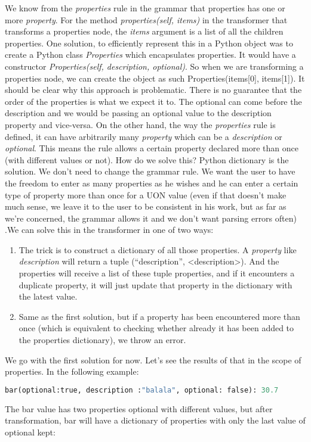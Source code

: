 \documentclass[12pt]{article}
\begin{document}
We know from the \emph{properties} rule in the grammar that properties has one or more \emph{property}. For the method \emph{properties(self, items)} in the transformer that transforms a properties node, the \emph{items} argument is a list of all the children properties. One solution, to efficiently represent this in a Python object was to create a Python class \emph{Properties} which encapsulates properties. It would have a constructor \emph{Properties(self, description, optional)}. So when we are transforming a properties node, we can create the object as such Properties(items[0], items[1]). It should be clear why this approach is problematic. There is no guarantee that the order of the properties is what we expect it to. The optional can come before the description and we would be passing an optional value to the description property and vice-versa. On the other hand, the way the \emph{properties} rule is defined, it can have arbitrarily many \emph{property} which can be a \emph{description} or \emph{optional}. This means the rule allows a certain property declared more than once (with different values or not).
How do we solve this? Python dictionary is the solution. We don’t need to change the grammar rule. We want the user to have the freedom to enter as many properties as he wishes and he can enter a certain type of property more than once for a UON value (even if that doesn't make much sense, we leave it to the user to be consistent in his work, but as far as we're concerned, the grammar allows it and we don't want parsing errors often) .We can solve this in the transformer in one of two ways: 
\begin{enumerate}
    \item The trick is to construct a dictionary of all those properties. A \emph{property} like \emph{description} will return a tuple (“description”, <description>). And the properties will receive a list of these tuple properties, and if it encounters a duplicate property, it will just update that property in the dictionary with the latest value.
    \item Same as the first solution, but if a property has been encountered more than once (which is equivalent to checking whether already it has been added to the properties dictionary), we throw an error.
\end{enumerate}

We go with the first solution for now. Let's see the results of that in the scope of properties. In the following example:
\begin{lstlisting}[language=Python]
bar(optional:true, description :"balala", optional: false): 30.7
\end{lstlisting}
The bar value has two properties optional with different values, but after transformation, bar will have a dictionary of properties with only the last value of optional kept:
\end{document}
